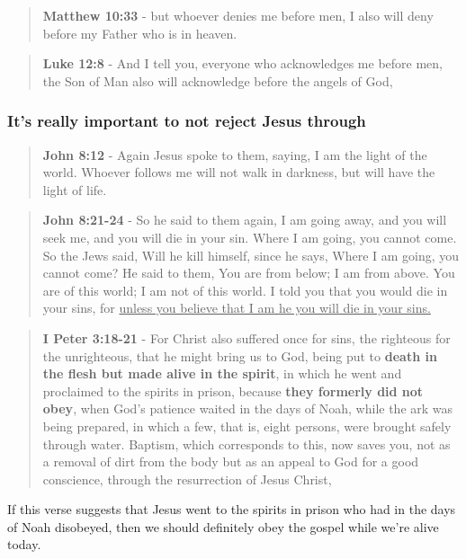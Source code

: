 \documentclass[11pt]{article}
\begin{document}
\begin{quote}
\textbf{Matthew 10:33} - but whoever denies me before men, I also will deny before my Father who is in heaven.
\end{quote}

\begin{quote}
\textbf{Luke 12:8} - And I tell you, everyone who acknowledges me before men, the Son of Man also will acknowledge before the angels of God,
\end{quote}

\subsubsection{It's \textbf{really} important to not reject Jesus through}
\label{sec:orgbc96676}
\begin{quote}
\textbf{John 8:12} - Again Jesus spoke to them, saying, I am the light of the world. Whoever follows me will not walk in darkness, but will have the light of life.
\end{quote}

\begin{quote}
\textbf{John 8:21-24} - So he said to them again, I am going away, and you will seek me, and you will die in your sin. Where I am going, you cannot come. So the Jews said, Will he kill himself, since he says, Where I am going, you cannot come? He said to them, You are from below; I am from above. You are of this world; I am not of this world. I told you that you would die in your sins, for \uline{unless you believe that I am he you will die in your sins.}
\end{quote}

\begin{quote}
\textbf{I Peter 3:18-21} - For Christ also suffered once for sins, the righteous for the unrighteous, that he might bring us to God, being put to \textbf{death in the flesh but made alive in the spirit}, in which he went and proclaimed to the spirits in prison, because \textbf{they formerly did not obey}, when God's patience waited in the days of Noah, while the ark was being prepared, in which a few, that is, eight persons, were brought safely through water. Baptism, which corresponds to this, now saves you, not as a removal of dirt from the body but as an appeal to God for a good conscience, through the resurrection of Jesus Christ,
\end{quote}

If this verse suggests that Jesus went to the spirits in prison who had in the days of Noah disobeyed, then we should definitely obey the gospel while we're alive today.
\end{document}
